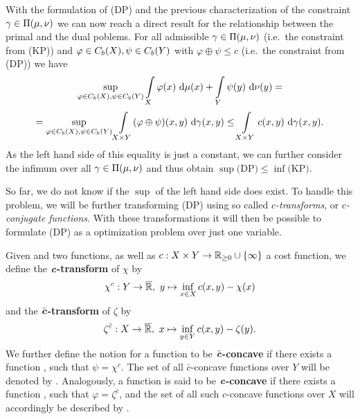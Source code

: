 With the formulation of (DP) and the previous characterization of the constraint $\gamma \in \TP{\mu}{\nu}$ we can now reach a direct result for the relationship between the primal and the dual poblems. For all admissible $\gamma \in \TP{\mu}{\nu}$ (i.e.~the constraint from (KP)) and $\varphi \in \CF[b]{X}, \psi \in \CF[b]{Y}$ with $\varphi \oplus \psi \le c$ (i.e.~the constraint from (DP)) we have
\[ \sup\limits_{\varphi \in \CF[b]{X}, \psi \in \CF[b]{Y}} \int\limits_{X} \varphi(x)~\Dx{\mu} + \int\limits_{Y} \psi(y)~\Dx[y]{\nu} = \]
\[ = \sup\limits_{\varphi \in \CF[b]{X}, \psi \in \CF[b]{Y}} \int\limits_{X \times Y} (\varphi \oplus \psi)(x, y)~\Dx[x, y]{\gamma} \le \int\limits_{X \times Y} c(x, y)~\Dx[x, y]{\gamma}. \]
As the left hand side of this equality is just a constant, we can further consider the infimum over all $\gamma \in \TP{\mu}{\nu}$ and thus obtain $\sup \text{(DP)} \le \inf \text{(KP)}$.

So far, we do not know if the $\sup$ of the left hand side does exist. To handle this problem, we will be further transforming (DP) using so called \textit{$c$-transforms}, or \textit{$c$-conjugate functions}. With these transformations it will then be possible to formulate (DP) as a optimization problem over just one variable.

\begin{definition}\label{cTrafo}
	Given  and  two functions, as well as $\map[c]{X \times Y}{\RZero{} \cup{} \{ \infty \}}$ a cost function, we define the \textbf{$\text{\textbf{\textit{c}}}$-transform} of $\chi$ by
	\[ \map[\chi^c]{Y}{\Rbar},~y \mapsto \inf\limits_{x \in X} c(x, y) - \chi(x) \]
	and the \textbf{$\bar{\text{\textbf{\textit{c}}}}$-transform} of $\zeta$ by
	\[ \map[\zeta^{\bar{c}}]{X}{\Rbar},~x \mapsto \inf\limits_{y \in Y} c(x, y) - \zeta(y). \]
	We further define the notion for a function  to be \textbf{$\bar{\text{\textbf{\textit{c}}}}$-concave} if there exists a function , such that $\psi = \chi^c$. The set of all $\bar{c}$-concave functions over $Y$ will be denoted by . Analogously, a function  is said to be \textbf{$\text{\textbf{\textit{c}}}$-concave} if there exists a function , such that $\varphi = \zeta^{\bar{c}}$, and the set of all such $c$-concave functions over $X$ will accordingly be described by .
\end{definition}

